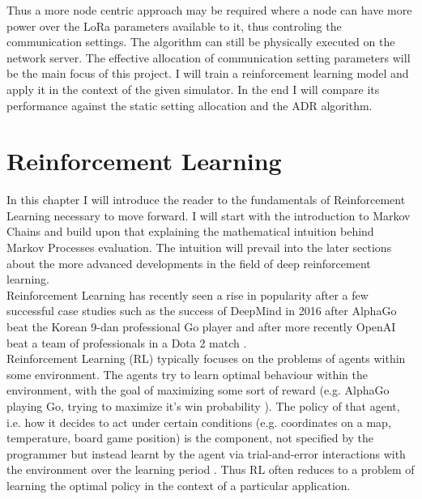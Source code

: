 Thus a more node centric approach may be required 
where a node can have more power over the LoRa parameters
available to it, thus controling the communication settings.
The algorithm can still be physically executed on the
network server. The effective allocation of communication
setting parameters will be the main focus of this project. 
I will train a reinforcement learning model and apply it
in the context of the given simulator. In the end I will
compare its performance against the static setting allocation and the ADR algorithm.




\chapter{Reinforcement Learning} 

In this chapter I will introduce the reader to the fundamentals of Reinforcement Learning necessary to move 
forward. I will start with the introduction to Markov Chains
and build upon that explaining the mathematical intuition
behind Markov Processes evaluation. The intuition will prevail 
into the later sections about the more advanced developments in 
the field of deep reinforcement learning.\\

Reinforcement Learning has recently seen a rise in popularity after a few successful case studies such as the success of DeepMind in 2016 after AlphaGo beat the Korean 9-dan professional Go player \cite{alpha_go_lee_sedol} and after more recently OpenAI beat a team of professionals in a Dota 2 match \cite{dota}.\\

Reinforcement Learning (RL) typically focuses on the problems of agents within some environment. The agents try to learn optimal behaviour within the environment, with the goal of maximizing some sort of reward (e.g. AlphaGo playing Go, trying to maximize it's win probability \cite{alpha_go_lee_sedol}). The policy of that agent, i.e. how it decides to act under certain conditions (e.g. coordinates on a map, temperature, board game position) is the component, not specified by the programmer but instead learnt by the agent via trial-and-error interactions with the environment over the learning period \cite{sutton_barto}. Thus RL often reduces to a problem of learning the optimal policy in the context of a particular application.\\

